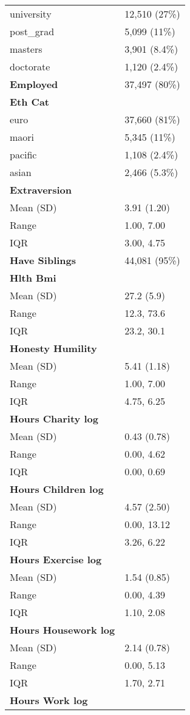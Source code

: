 \documentclass[
  singlecolumn]{article}
\begin{document}
\begin{longtable}[]{@{}ll@{}}
university & 12,510 (27\%) \\
post\_grad & 5,099 (11\%) \\
masters & 3,901 (8.4\%) \\
doctorate & 1,120 (2.4\%) \\
\textbf{Employed} & 37,497 (80\%) \\
\textbf{Eth Cat} & \\
euro & 37,660 (81\%) \\
maori & 5,345 (11\%) \\
pacific & 1,108 (2.4\%) \\
asian & 2,466 (5.3\%) \\
\textbf{Extraversion} & \\
Mean (SD) & 3.91 (1.20) \\
Range & 1.00, 7.00 \\
IQR & 3.00, 4.75 \\
\textbf{Have Siblings} & 44,081 (95\%) \\
\textbf{Hlth Bmi} & \\
Mean (SD) & 27.2 (5.9) \\
Range & 12.3, 73.6 \\
IQR & 23.2, 30.1 \\
\textbf{Honesty Humility} & \\
Mean (SD) & 5.41 (1.18) \\
Range & 1.00, 7.00 \\
IQR & 4.75, 6.25 \\
\textbf{Hours Charity log} & \\
Mean (SD) & 0.43 (0.78) \\
Range & 0.00, 4.62 \\
IQR & 0.00, 0.69 \\
\textbf{Hours Children log} & \\
Mean (SD) & 4.57 (2.50) \\
Range & 0.00, 13.12 \\
IQR & 3.26, 6.22 \\
\textbf{Hours Exercise log} & \\
Mean (SD) & 1.54 (0.85) \\
Range & 0.00, 4.39 \\
IQR & 1.10, 2.08 \\
\textbf{Hours Housework log} & \\
Mean (SD) & 2.14 (0.78) \\
Range & 0.00, 5.13 \\
IQR & 1.70, 2.71 \\
\textbf{Hours Work log} & \\

\end{longtable}
\end{document}
